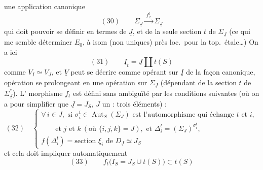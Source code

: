 \documentclass[11pt,a4paper]{article}
\begin{document}
une application canonique
\[
  (30) \qquad \Sigma_{\underline{J}} \xrightarrow{\;f_2^t\;} \Sigma_{\underline{J}}
\]
qui doit pouvoir se définir en termes de $\underline{J}$, et de la seule
section $t$ de $\Sigma_{\underline{J}}$ (ce qui me semble déterminer $E_0$,
à isom (non uniques) près loc.\ pour la top.\ étale\ldots)
On a ici
\[
  (31) \qquad \underline{I}_t = \underline{J} \amalg t(S)
\]
comme $V_{\underline{I}} \simeq V_{\underline{J}}$, et 
$\underline{V}$ peut se décrire comme opérant sur $\underline{I}$ de la
façon canonique,  opération se prolongeant en une opération
sur $\Sigma_{\underline{J}}$ (dépendant de la section $t$ de
$\Sigma_{\underline{J}}^*$). L' morphisme $f_t$ est
défini sans ambiguïté par les conditions suivantes (où on a
 pour simplifier que $\underline{J} = J_S$, $J$ un
\ill{} : trois éléments) :
\[
  (32) \quad
  \begin{cases}
    \forall\, i \in J, \text{ si } \sigma_i^t \in \operatorname{Aut}_S(\Sigma_J)
      \text{ est l'automorphisme qui échange } t \text{ et } i, \\
    \qquad \text{et } j \text{ et } k \ (\text{où } \{i,j,k\} = J),
      \text{ et } \Delta_i^t = (\Sigma_J)^{\sigma_i^t}, \\
    f(\Delta_i^t) = \text{section } \xi_i \text{ de } D_{\underline{J}} \simeq J_S
  \end{cases}
\]
et cela doit impliquer automatiquement
\[
  (33) \qquad f_t\bigl(I_S = J_S \cup t(S)\bigr) \subset t(S)
\]
\end{document}
